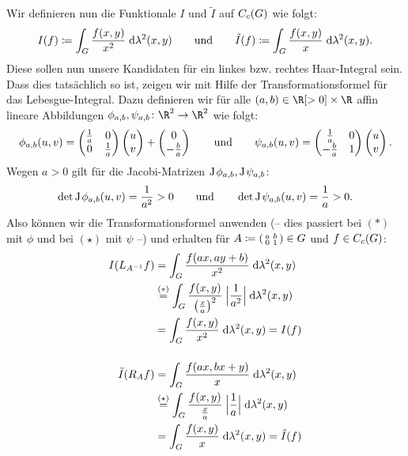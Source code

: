 \begin{BspList}[\label{tg:haarbsp}]
    Wir definieren nun die Funktionale $I$ und $\tilde I$ auf $C_c(G)$ wie folgt:
    \[  I(f) \coloneqq \int_G \frac{f(x,y)}{x^2} \;\mathrm{d} \lambda^2(x,y) 
        \qquad\text{und}\qquad
        \tilde I(f) \coloneqq \int_G \frac{f(x,y)}{x}   \;\mathrm{d} \lambda^2(x,y)
    . \]
    Diese sollen nun unsere Kandidaten für ein linkes bzw. rechtes Haar-Integral
    sein. Dass dies tatsächlich so ist, zeigen wir mit Hilfe der
    Transformationsformel für das Lebesgue-Integral. Dazu definieren wir für
    alle $(a,b)\in\R[>0]\times\R$ affin lineare Abbildungen 
    $\phi_{a,b},\psi_{a,b}\colon \R^2\to\R^2$ wie folgt:
    \[ 
        \phi_{a,b}(u,v) 
        = \begin{pmatrix}  \frac{1}{a} & 0 \\ 0 & \frac{1}{a}  \end{pmatrix} \begin{pmatrix} u\\v \end{pmatrix} 
            + \begin{pmatrix} 0\\-\frac{b}{a} \end{pmatrix}
        \qquad\text{und}\qquad
        \psi_{a,b}(u,v)
        = \begin{pmatrix}  \frac{1}{a} & 0 \\ -\frac{b}{a} & 1  \end{pmatrix} \begin{pmatrix} u\\v \end{pmatrix}
    . \]
    Wegen $a>0$ gilt für die Jacobi-Matrizen $\operatorname{J\mkern-1mu}\phi_{a,b},\operatorname{J\mkern-1mu}\psi_{a,b}$:
    \[  \det\operatorname{J\mkern-1mu}\phi_{a,b}(u,v) = \frac{1}{a^2} > 0
        \qquad\text{und}\qquad
        \det\operatorname{J\mkern-1mu}\psi_{a,b}(u,v) = \frac{1}{a} > 0
    . \]
    Also können wir die Transformationsformel anwenden (-- dies passiert bei
    $(\ast)$ mit $\phi$ und bei $(\star)$ mit $\psi$ --) und erhalten für $A
    \coloneqq \begin{psmallmatrix}a & b \\ 0 & 1\end{psmallmatrix} \in G$
    und $f\in C_c(G)$:
    \begin{align*}
        I(L_{A^{-1}}f) 
        &= \int_G \frac{f(ax,ay+b)}{x^2} \dif{\lambda^2(x,y)}   \\
        &\overset{(\ast)}{=}                                    %
        \int_G \frac{f(x,y)}{\left(\frac{x}{a}\right)^2} \;     %
            \abs[\Big]{\frac{1}{a^2}}  \dif{\lambda^2(x,y)}     \\
        &= \int_G \frac{f(x,y)}{x^2} \dif{\lambda^2(x,y)} = I(f)
        \\[3ex]
        \tilde I(R_{A}f) 
        &= \int_G \frac{f(ax,bx+y)}{x} \dif{\lambda^2(x,y)}     \\
        &\overset{(\star)}{=}                                   %
        \int_G \frac{f(x,y)}{\frac{x}{a}} \;                    %
            \abs[\Big]{\frac{1}{a}}  \dif{\lambda^2(x,y)}       \\
        &= \int_G \frac{f(x,y)}{x} \dif{\lambda^2(x,y)} = \tilde I(f)

\end{align*}
\end{BspList}
